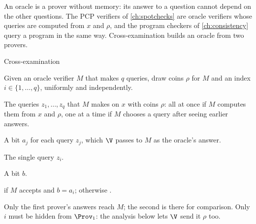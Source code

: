 \begin{refsection}

An oracle is a prover without memory: its answer to a question cannot depend on the other questions. The PCP verifiers of \cref{ch:spotchecks} are oracle verifiers whose queries are computed from $x$ and $\rho$, and the program checkers of \cref{ch:consistency} query a program in the same way. Cross-examination builds an oracle from two provers.

\begin{protocol}{Cross-examination}\label{prot:crossexam:main}
\item[\act{V}] Given an oracle verifier $M$ that makes $q$ queries, draw coins $\rho$ for $M$ and an index $i\in\{1,\dots,q\}$, uniformly and independently.
\item[\msg{V}{P_1}] The queries $z_1,\dots,z_q$ that $M$ makes on $x$ with coins $\rho$: all at once if $M$ computes them from $x$ and $\rho$, one at a time if $M$ chooses a query after seeing earlier answers.
\item[\msg{P_1}{V}] A bit $a_j$ for each query $z_j$, which $\V$ passes to $M$ as the oracle's answer.
\item[\msg{V}{P_2}] The single query $z_i$.
\item[\msg{P_2}{V}] A bit $b$.
\item[\act{V}] \acc{} if $M$ accepts and $b=a_i$; otherwise \rej.
\end{protocol}

Only the first prover's answers reach $M$; the second is there for comparison. Only $i$ must be hidden from $\Prov_1$: the analysis below lets $\V$ send it $\rho$ too.


\end{refsection}
